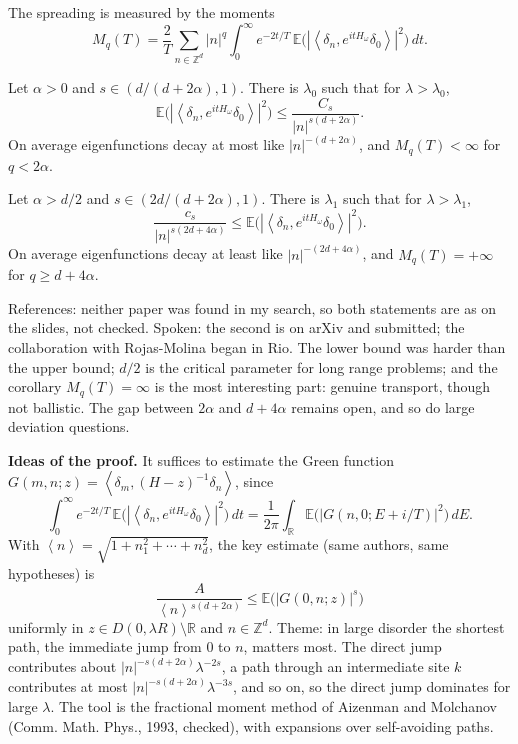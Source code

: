 The spreading is measured by the moments
$$
M_q(T) = \frac{2}{T}\sum_{n \in
\mathbb{Z}^d} |n|^q \int_0^\infty
e^{-2t/T}\,
\mathbb{E}\big(|\left\langle{} \delta_n,
e^{itH_\omega}\delta_0 \right\rangle{}|^2
\big)\,dt.
$$

\begin{theorem}
\label{theorem-drm-upper}
Let $\alpha > 0$ and
$s \in (d/(d+2\alpha),1)$. There is
$\lambda_0$ such that for $\lambda >
\lambda_0$,
$$
\mathbb{E}\big(|\left\langle{} \delta_n,
e^{itH_\omega}\delta_0 \right\rangle{}|^2
\big) \le \frac{C_s}{|n|^{s(d+2\alpha)}}.
$$
On average eigenfunctions decay at most
like $|n|^{-(d+2\alpha)}$, and $M_q(T) <
\infty$ for $q < 2\alpha$.
\end{theorem}

\begin{theorem}
\label{theorem-hmr-lower}
Let $\alpha > d/2$ and
$s \in (2d/(d+2\alpha),1)$. There is
$\lambda_1$ such that for $\lambda >
\lambda_1$,
$$
\frac{c_s}{|n|^{s(2d+4\alpha)}} \le
\mathbb{E}\big(|\left\langle{} \delta_n,
e^{itH_\omega}\delta_0 \right\rangle{}|^2
\big).
$$
On average eigenfunctions decay at least
like $|n|^{-(2d+4\alpha)}$, and
$M_q(T) = +\infty$ for $q \ge d + 4\alpha$.
\end{theorem}

\noindent
References: neither paper was found in my
search, so both statements are as on the
slides, not checked. Spoken: the second is
on arXiv and submitted; the collaboration
with Rojas-Molina began in Rio. The lower
bound was harder than the upper bound;
$d/2$ is the critical parameter for long
range problems; and the corollary
$M_q(T) = \infty$ is the most interesting
part: genuine transport, though not
ballistic. The gap between $2\alpha$ and
$d + 4\alpha$ remains open, and so do
large deviation questions.

\medskip\noindent
{\bf Ideas of the proof.} It suffices to
estimate the Green function
$G(m,n;z) = \left\langle{} \delta_m,
(H-z)^{-1}\delta_n \right\rangle{}$, since
$$
\int_0^\infty e^{-2t/T}\,
\mathbb{E}\big(|\left\langle{} \delta_n,
e^{itH_\omega}\delta_0 \right\rangle{}|^2
\big)\,dt
= \frac{1}{2\pi}\int_{\mathbb{R}}
\mathbb{E}\big(|G(n,0;E+i/T)|^2\big)\,dE.
$$
With $\left\langle{} n \right\rangle{} =
\sqrt{1 + n_1^2 + \cdots + n_d^2}$, the key
estimate (same authors, same hypotheses) is
$$
\frac{A}{\left\langle{} n
\right\rangle{}^{s(d+2\alpha)}}
\le \mathbb{E}\big(|G(0,n;z)|^s\big)
$$
uniformly in $z \in D(0,\lambda R)
\setminus \mathbb{R}$ and $n \in
\mathbb{Z}^d$. Theme: in large disorder the
shortest path, the immediate jump from $0$
to $n$, matters most. The direct jump
contributes about
$|n|^{-s(d+2\alpha)}\lambda^{-2s}$, a path
through an intermediate site $k$ contributes
at most $|n|^{-s(d+2\alpha)}\lambda^{-3s}$,
and so on, so the direct jump dominates for
large $\lambda$. The tool is the fractional
moment method of Aizenman and Molchanov
(Comm. Math. Phys., 1993, checked), with
expansions over self-avoiding paths.

